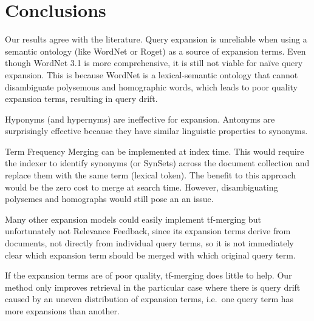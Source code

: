 









\section{Conclusions}

Our results agree with the literature. Query expansion is unreliable when using a semantic ontology (like WordNet or Roget) as a source of expansion terms. Even though WordNet 3.1 is more comprehensive, it is still not viable for na{\"i}ve query expansion. This is because WordNet is a lexical-semantic ontology that cannot disambiguate polysemous and homographic words, which leads to poor quality expansion terms, resulting in query drift.


Hyponyms (and hypernyms) are ineffective for expansion. Antonyms are surprisingly effective because they have similar linguistic properties to synonyms.

Term Frequency Merging can be implemented at index time. This would require the indexer to identify synonyms (or SynSets) across the document collection and replace them with the same term (lexical token). The benefit to this approach would be the zero cost to merge at search time. However, disambiguating polysemes and homographs would still pose an an issue.

Many other expansion models could easily implement tf-merging but unfortunately not Relevance Feedback, since its expansion terms derive from documents, not directly from individual query terms, so it is not immediately clear which expansion term should be merged with which original query term.

If the expansion terms are of poor quality, tf-merging does little to help. Our method only improves retrieval in the particular case where there is query drift caused by an uneven distribution of expansion terms, i.e.\ one query term has more expansions than another.


